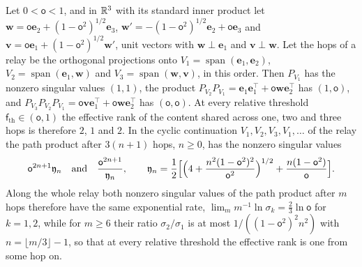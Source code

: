 \begin{example}\label{ex:ren-rank-nonmonotone}
Let $0<\mathsf o<1$, and in $\mathbb{R}^3$ with its standard inner product let $\mathbf w=\mathsf o\mathbf e_2+(1-\mathsf o^2)^{1/2}\mathbf e_3$, $\mathbf w'=-(1-\mathsf o^2)^{1/2}\mathbf e_2+\mathsf o\mathbf e_3$ and $\mathbf v=\mathsf o\mathbf e_1+(1-\mathsf o^2)^{1/2}\mathbf w'$, unit vectors with $\mathbf w\perp\mathbf e_1$ and $\mathbf v\perp\mathbf w$. Let the hops of a relay be the orthogonal projections onto $V_1=\operatorname{span}(\mathbf e_1,\mathbf e_2)$, $V_2=\operatorname{span}(\mathbf e_1,\mathbf w)$ and $V_3=\operatorname{span}(\mathbf w,\mathbf v)$, in this order. Then $P_{V_1}$ has the nonzero singular values $(1,1)$, the product $P_{V_2}P_{V_1}=\mathbf e_1\mathbf e_1^\top+\mathsf o\mathbf w\mathbf e_2^\top$ has $(1,\mathsf o)$, and $P_{V_3}P_{V_2}P_{V_1}=\mathsf o\mathbf v\mathbf e_1^\top+\mathsf o\mathbf w\mathbf e_2^\top$ has $(\mathsf o,\mathsf o)$. At every relative threshold $\mathsf f_{\mathrm{th}}\in(\mathsf o,1)$ the effective rank of the content shared across one, two and three hops is therefore $2$, $1$ and $2$. In the cyclic continuation $V_1,V_2,V_3,V_1,\dots$ of the relay the path product after $3(n+1)$ hops, $n\ge0$, has the nonzero singular values
\begin{equation}\label{eq:ren-rank-cyclic}
\mathsf o^{2n+1}\mathfrak y_n\quad\text{and}\quad\frac{\mathsf o^{2n+1}}{\mathfrak y_n},\qquad\mathfrak y_n=\frac12\Bigl[\Bigl(4+\frac{n^2(1-\mathsf o^2)^2}{\mathsf o^2}\Bigr)^{1/2}+\frac{n(1-\mathsf o^2)}{\mathsf o}\Bigr].
\end{equation}
Along the whole relay both nonzero singular values of the path product after $m$ hops therefore have the same exponential rate, $\lim_mm^{-1}\ln\sigma_k=\frac23\ln\mathsf o$ for $k=1,2$, while for $m\ge6$ their ratio $\sigma_2/\sigma_1$ is at most $1/((1-\mathsf o^2)^2n^2)$ with $n=\lfloor m/3\rfloor-1$, so that at every relative threshold the effective rank is one from some hop on.
\end{example}
